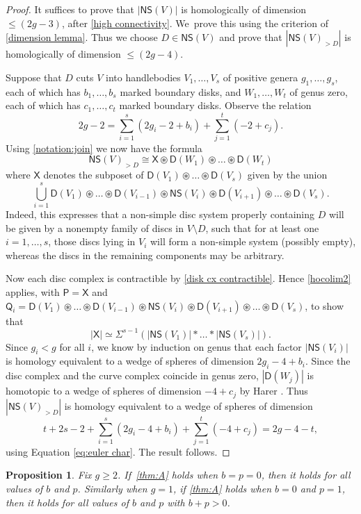 \documentclass[JEP,XML,SOM,Unicode,NoFloatCountersInSection,published]{cedram}
\theoremstyle{plain}
\newtheorem{prop}[thm]{Proposition}
\theoremstyle{definition}
\let\altjoin\circledast
\newcommand{\NS}{\mathsf{NS}}
\newcommand{\D}{\mathsf{D}}
\begin{document}
\begin{proof}It suffices to prove that $|\NS(V)|$ is homologically of dimension~$\leq (2g-3)$, after \cref{high connectivity}. We~prove this using the criterion of \cref{dimension lemma}. Thus we choose $D \in \NS(V)$ and prove that $|\NS(V)_{>D}|$ is homologically of dimension $\leq (2g-4)$.

Suppose that $D$ cuts $V$ into handlebodies $V_1,\dots,V_{s}$ of positive genera $g_1,\dots,g_s$, each of which has $b_1,\dots,b_s$ marked boundary disks, and $W_1,\dots,W_t$ of genus zero, each of which has $c_1,\dots,c_t$ marked boundary disks. Observe the relation
\begin{equation}\tag{$\star$}\label{eq:euler char}
2g-2 = \sum_{i=1}^s (2g_i - 2 + b_i) + \sum_{j=1}^t (-2+c_j).
\end{equation}
Using \cref{notation:join} we now have the formula
\[
\NS(V)_{>D} \cong \mathsf X \altjoin \D(W_1) \altjoin \dots \altjoin \D(W_t)
\]
where $\mathsf X$ denotes the subposet of $\D(V_1) \altjoin \dots \altjoin \D(V_s)$ given by the union
\[
\bigcup_{i=1}^s \D(V_1) \altjoin \dots \altjoin \D(V_{i-1}) \altjoin \NS(V_i) \altjoin \D(V_{i+1}) \altjoin \dots \altjoin \D(V_s).
\]Indeed, this expresses that a non-simple disc system properly containing $D$ will be given by a nonempty family of discs in $V \setminus D$, such that for at least one $i=1,\dots,s$, those discs lying in $V_i$ will form a non-simple system (possibly empty), whereas the discs in the remaining components may be arbitrary.

Now each disc complex is contractible by \cref{disk cx contractible}. Hence \cref{hocolim2} applies, with $\mathsf P = \mathsf X$ and $\mathsf Q_i = \D(V_1) \altjoin \dots \altjoin \D(V_{i-1}) \altjoin \NS(V_i) \altjoin \D(V_{i+1}) \altjoin \dots \altjoin \D(V_s)$, to show that
\[
|\mathsf X| \simeq \Sigma^{s-1} (|\NS(V_1)| \ast \dots \ast |\NS(V_s)|) .
\]
Since $g_i<g$ for all $i$, we know by induction on genus that each factor $|\NS(V_i)|$ is homology equivalent to a wedge of spheres of dimension $2g_i-4+b_i$. Since the disc complex and the curve complex coincide in genus zero, $|\D(W_j)|$ is homotopic to a wedge of spheres of dimension $-4+c_j$ by Harer \cite{harer}. Thus $|\NS(V)_{>D}|$ is homology equivalent to a wedge of spheres of dimension
\[
t+ 2s-2+ \sum_{i=1}^s (2g_i-4+b_i) + \sum_{j=1}^t (-4+c_j) = 2g-4-t,
\]
using Equation \eqref{eq:euler char}. The result follows. \end{proof}

\begin{prop}\label{birman trick} Fix $g \geq 2$. If~\cref{thm:A} holds when $b=p=0$, then it holds for all values of $b$ and $p$. Similarly when $g=1$, if \cref{thm:A} holds when $b=0$ and $p=1$, then it holds for all values of $b$ and $p$ with $b+p>0$.
\end{prop}
\end{document}
